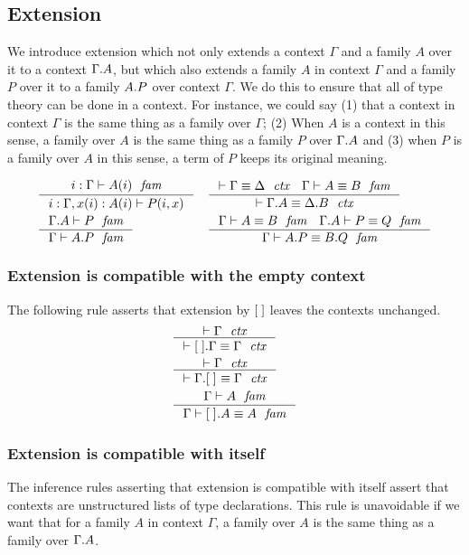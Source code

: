 \subsection{Extension}
We introduce extension which not only extends a context $\Gamma$ and a family
$A$ over it to a context $\ctxext{\Gamma}{A}$, but which also extends a family $A$
in context $\Gamma$ and a family $P$ over it to a family $\ctxext{A}{P}$ over context
$\Gamma$. We do this to ensure that all of type theory can be done in a context.
For instance, we could say (1) that a context in context $\Gamma$ is the same thing
as a family over $\Gamma$; (2) When $A$ is a context in this sense, a family over
$A$ is the same thing as a family $P$ over $\ctxext{\Gamma}{A}$ and 
(3) when $P$ is a family over $A$ in this sense, a term of $P$ keeps its original meaning.

\begin{align}
& \inference
  {\jvfam{i}{\Gamma}{A}}
  {\jvfamcombi{{i}{x}}{{\Gamma}{A}}{P}}
& & \inference
    {\jctxeq{\Gamma}{\Delta}
     \jfameq{\Gamma}{A}{B}}
    {\jctxeq{\ctxext{\Gamma}{A}}{\ctxext{\Delta}{B}}}\\
& \inference
  {\jfam{{\Gamma}{A}}{P}}
  {\jfam{\Gamma}{\ctxext{A}{P}}}
& & \inference
    {\jfameq{\Gamma}{A}{B}
     \jfameq{{\Gamma}{A}}{P}{Q}}
    {\jfameq{\Gamma}{\ctxext{A}{P}}{\ctxext{B}{Q}}}
\end{align}

\subsubsection{Extension is compatible with the empty context}
The following rule asserts that extension by ${[\;]}$ leaves the contexts unchanged.
\begin{align}
& \inference
  {\jctx{\Gamma}}
  {\jctxeq{\ctxext{\emptyc}{\Gamma}}{\Gamma}}\\
& \inference
  {\jctx{\Gamma}}
  {\jctxeq{\ctxext{\Gamma}{\emptyf}}{\Gamma}}\\
& \inference
  {\jfam{\Gamma}{A}}
  {\jfameq{\Gamma}{\ctxext{\emptyf}{A}}{A}}
\end{align}

\subsubsection{Extension is compatible with itself}\label{comp-ee}
The inference rules asserting that extension is compatible with itself assert
that contexts are unstructured lists of type declarations. This rule is
unavoidable if we want that for a family $A$ in context $\Gamma$, a family over
$A$ is the same thing as a family over $\ctxext{\Gamma}{A}$. 

